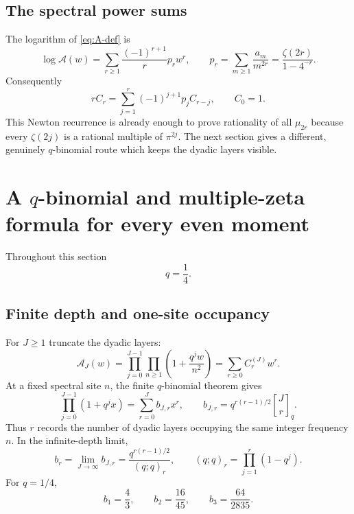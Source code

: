 \documentclass[11pt,oneside]{article}
\theoremstyle{definition}
\theoremstyle{remark}
\newcommand{\qbinom}[3]{\genfrac{[}{]}{0pt}{}{#1}{#2}_{#3}}
\begin{document}
\subsection{The spectral power sums}

The logarithm of \cref{eq:A-def} is
\begin{equation}\label{eq:logA-power}
 \log\mathcal A(w)
 =\sum_{r\ge1}\frac{(-1)^{r+1}}r p_rw^r,
 \qquad
 p_r=\sum_{m\ge1}\frac{a_m}{m^{2r}}
 =\frac{\zeta(2r)}{1-4^{-r}}.
\end{equation}
Consequently
\begin{equation}\label{eq:C-recurrence}
 rC_r=\sum_{j=1}^{r}(-1)^{j+1}p_jC_{r-j},\qquad C_0=1.
\end{equation}
This Newton recurrence is already enough to prove rationality of all
$\mu_{2r}$ because every $\zeta(2j)$ is a rational multiple of $\pi^{2j}$.
The next section gives a different, genuinely $q$-binomial route which keeps
the dyadic layers visible.

\section{A $q$-binomial and multiple-zeta formula for every even moment}

Throughout this section
\begin{equation}\label{eq:q-def}
 q=\frac14.
\end{equation}

\subsection{Finite depth and one-site occupancy}

For $J\ge1$ truncate the dyadic layers:
\begin{equation}\label{eq:AJ-def}
 \mathcal A_J(w)=\prod_{j=0}^{J-1}\prod_{n\ge1}
 \left(1+\frac{q^jw}{n^2}\right)
 =\sum_{r\ge0}C_r^{(J)}w^r.
\end{equation}
At a fixed spectral site $n$, the finite $q$-binomial theorem gives
\begin{equation}\label{eq:finite-qbinom}
 \prod_{j=0}^{J-1}(1+q^jx)
 =\sum_{r=0}^{J}b_{J,r}x^r,
 \qquad
 b_{J,r}=q^{r(r-1)/2}\qbinom{J}{r}{q}.
\end{equation}
Thus $r$ records the number of dyadic layers occupying the same integer
frequency $n$.  In the infinite-depth limit,
\begin{equation}\label{eq:b-infty}
 b_r=\lim_{J\to\infty}b_{J,r}
 =\frac{q^{r(r-1)/2}}{(q;q)_r},
 \qquad (q;q)_r=\prod_{j=1}^{r}(1-q^j).
\end{equation}
For $q=1/4$,
\begin{equation}\label{eq:b-first}
 b_1=\frac43,\qquad b_2=\frac{16}{45},\qquad
 b_3=\frac{64}{2835}.
\end{equation}
\end{document}
